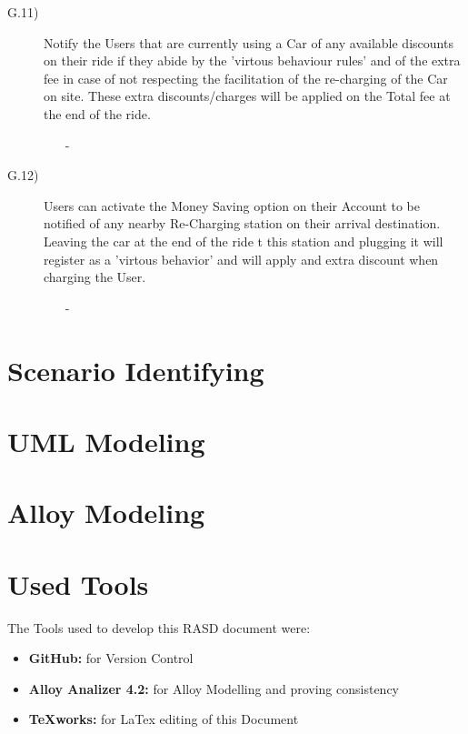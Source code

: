 \documentclass[a4paper]{article}
\begin{document}
\begin{description}
\item [G.11)]Notify the Users that are currently using a Car of any available discounts on their ride if they abide by the 'virtous behaviour rules' and of the extra fee in case of not respecting the facilitation of the re-charging of the Car on site. These extra discounts/charges will be applied on the Total fee at the end of the ride.
\begin{itemize}
	\item[-]
\end{itemize}
\item [G.12)]Users can activate the Money Saving option on their Account to be notified of any nearby Re-Charging station on their arrival destination. Leaving the car at the end of the ride t this station and plugging it will register as a 'virtous behavior' and will apply and extra discount when charging the User.
\begin{itemize}
	\item[-]
\end{itemize}
\end{description}

\section{Scenario Identifying}

\section{UML Modeling}

\section{Alloy Modeling}
\newpage

\section{Used Tools}
The Tools used to develop this RASD document were:
\begin{itemize}
	\item \textbf{GitHub:} for Version Control
	\item \textbf{Alloy Analizer 4.2:} for Alloy Modelling and proving consistency 
	\item \textbf {TeXworks:} for LaTex editing of this Document
\end{itemize}
\newpage
\end{document}
